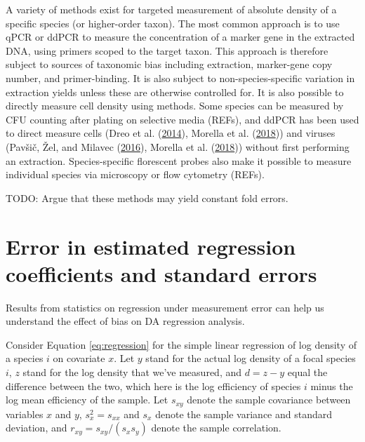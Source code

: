 \documentclass[
]{article}
\begin{document}
A variety of methods exist for targeted measurement of absolute density of a specific species (or higher-order taxon).
The most common approach is to use qPCR or ddPCR to measure the concentration of a marker gene in the extracted DNA, using primers scoped to the target taxon.
This approach is therefore subject to sources of taxonomic bias including extraction, marker-gene copy number, and primer-binding.
It is also subject to non-species-specific variation in extraction yields unless these are otherwise controlled for.
It is also possible to directly measure cell density using methods.
Some species can be measured by CFU counting after plating on selective media (REFs), and ddPCR has been used to direct measure cells (Dreo et al. (\protect\hyperlink{ref-dreo2014opti}{2014}), Morella et al. (\protect\hyperlink{ref-morella2018rapi}{2018})) and viruses (Pavšič, Žel, and Milavec (\protect\hyperlink{ref-pavsic2016digi}{2016}), Morella et al. (\protect\hyperlink{ref-morella2018rapi}{2018})) without first performing an extraction.
Species-specific florescent probes also make it possible to measure individual species via microscopy or flow cytometry (REFs).

TODO: Argue that these methods may yield constant fold errors.

\hypertarget{appendix-regression}{%
\section{Error in estimated regression coefficients and standard errors}\label{appendix-regression}}

Results from statistics on regression under measurement error can help us understand the effect of bias on DA regression analysis.

Consider Equation \eqref{eq:regression} for the simple linear regression of log density of a species \(i\) on covariate \(x\).
Let \(y\) stand for the actual log density of a focal species \(i\), \(z\) stand for the log density that we've measured, and \(d = z - y\) equal the difference between the two, which here is the log efficiency of species \(i\) minus the log mean efficiency of the sample.
Let \(s_{xy}\) denote the sample covariance between variables \(x\) and \(y\), \(s^{2}_{x} = s_{xx}\) and \(s_{x}\) denote the sample variance and standard deviation, and \(r_{xy} = s_{xy}/(s_{x}s_{y})\) denote the sample correlation.
\end{document}
